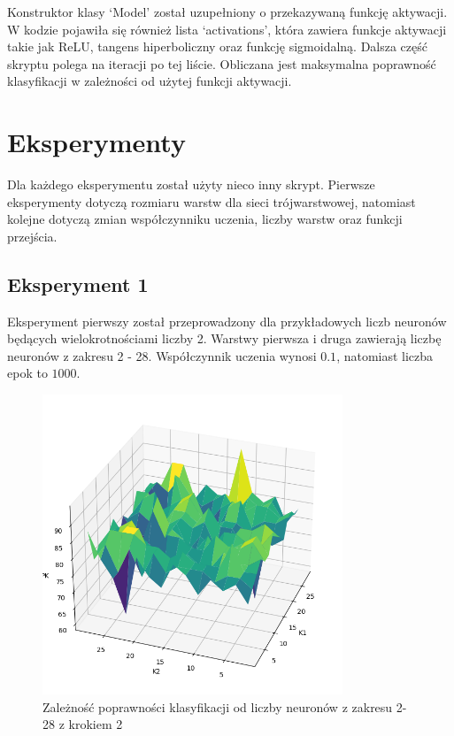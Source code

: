 \documentclass[a4paper]{article}
\begin{document}
Konstruktor klasy `Model' został uzupełniony o przekazywaną funkcję aktywacji.
W kodzie pojawiła się również lista `activations', która zawiera funkcje aktywacji takie jak ReLU, tangens hiperboliczny oraz funkcję sigmoidalną.
Dalsza część skryptu polega na iteracji po tej liście.
Obliczana jest maksymalna poprawność klasyfikacji w zależności od użytej funkcji aktywacji.

\newpage
\section{Eksperymenty}
Dla każdego eksperymentu został użyty nieco inny skrypt.
Pierwsze eksperymenty dotyczą rozmiaru warstw dla sieci trójwarstwowej, natomiast kolejne dotyczą zmian współczynniku uczenia, liczby warstw oraz funkcji przejścia.

\newpage
\subsection{Eksperyment 1}

Eksperyment pierwszy został przeprowadzony dla przykładowych liczb neuronów będących wielokrotnościami liczby 2.
Warstwy pierwsza i druga zawierają liczbę neuronów z zakresu 2 - 28.
Współczynnik uczenia wynosi $0.1$, natomiast liczba epok to $1000$.

\begin{figure}[H]
    \centering
    \includegraphics[width=0.8\textwidth, keepaspectratio]{pictures/k1_k2_dobre_1_1000echo.png}
    \caption{Zależność poprawności klasyfikacji od liczby neuronów z zakresu 2-28 z krokiem 2}
    \label{fig:k1k2_1}
\end{figure}
\end{document}
